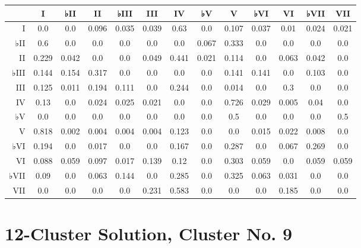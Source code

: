 \begin{table}[htbp]
\begin{minipage}{\linewidth}
\setlength{\tymax}{0.5\linewidth}
\centering
\small
\begin{tabulary}{\textwidth}{@{}RCCCCCCCCCCCC@{}} \toprule
&I&♭II&II&♭III&III&IV&♭V&V&♭VI&VI&♭VII&VII\\
\midrule
I&0.0&0.0&0.096&0.035&0.039&0.63&0.0&0.107&0.037&0.01&0.024&0.021\\
♭II&0.6&0.0&0.0&0.0&0.0&0.0&0.067&0.333&0.0&0.0&0.0&0.0\\
II&0.229&0.042&0.0&0.0&0.049&0.441&0.021&0.114&0.0&0.063&0.042&0.0\\
♭III&0.144&0.154&0.317&0.0&0.0&0.0&0.0&0.141&0.141&0.0&0.103&0.0\\
III&0.125&0.011&0.194&0.111&0.0&0.244&0.0&0.014&0.0&0.3&0.0&0.0\\
IV&0.13&0.0&0.024&0.025&0.021&0.0&0.0&0.726&0.029&0.005&0.04&0.0\\
♭V&0.0&0.0&0.0&0.0&0.0&0.0&0.0&0.5&0.0&0.0&0.0&0.5\\
V&0.818&0.002&0.004&0.004&0.004&0.123&0.0&0.0&0.015&0.022&0.008&0.0\\
♭VI&0.194&0.0&0.017&0.0&0.0&0.167&0.0&0.287&0.0&0.067&0.269&0.0\\
VI&0.088&0.059&0.097&0.017&0.139&0.12&0.0&0.303&0.059&0.0&0.059&0.059\\
♭VII&0.09&0.0&0.063&0.144&0.0&0.285&0.0&0.325&0.063&0.031&0.0&0.0\\
VII&0.0&0.0&0.0&0.0&0.231&0.583&0.0&0.0&0.0&0.185&0.0&0.0\\

\bottomrule

\end{tabulary}
\end{minipage}
\end{table}

\section{12-Cluster Solution, Cluster No. 9}
\label{12-clustersolutionclusterno.9}

